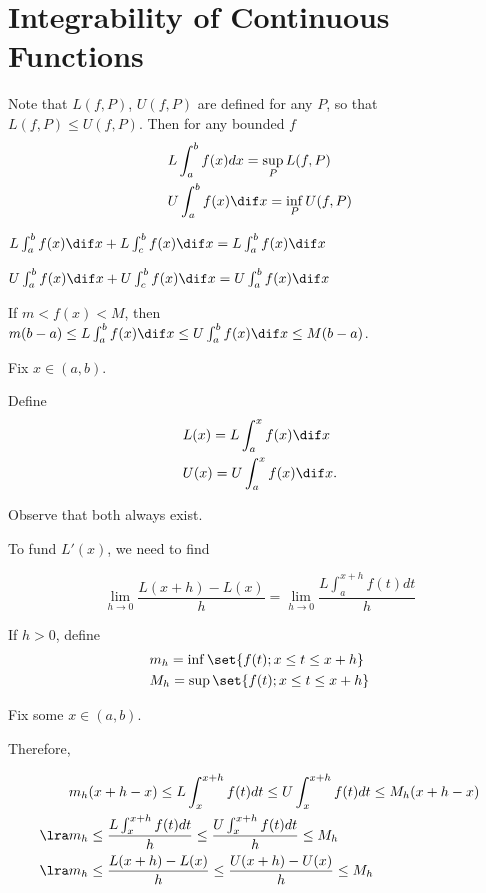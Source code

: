\documentclass[11pt]{scrartcl}
\begin{document}
\section{Integrability of Continuous Functions}

\begin{definition}
  Note that $L(f, P)$, $U(f, P)$ are defined for any $P$, so that
  $L(f, P) \leq U(f, P)$. Then for any bounded $f$
  \begin{align*}
    &L\int_a^bf(x)dx = \sup_PL(f, P)\\
    &U\int_a^bf(x)\dif x = \inf_PU(f, P)
  \end{align*}
\end{definition}

\begin{lemma}
  $L\int_a^bf(x)\dif x + L\int_c^bf(x)\dif x = L\int_a^bf(x)\dif x$
\end{lemma}
\begin{lemma}
  $U\int_a^bf(x)\dif x + U\int_c^bf(x)\dif x = U\int_a^bf(x)\dif x$
\end{lemma}

If $m< f(x) < M$, then
$m(b-a)\leq L\int_a^bf(x)\dif x \leq U\int_a^bf(x)\dif x \leq M(b-a)$.

Fix $x\in(a,b)$.

Define
\begin{align*}
 & L(x) = L\int_a^xf(x)\dif x\\
 & U(x) = U\int_a^xf(x)\dif x.
\end{align*}

Observe that both always exist.

To fund $L'(x)$, we need to find


\begin{equation*}
  \lim_{h\to 0 }\frac{L(x+h) - L(x)}{h} = \lim_{h\to 0 } \frac{L\int_a^{x+h}f(t)dt}{h}
\end{equation*}

If $h>0$, define
\begin{align}
  &m_{h} = \inf\set{f(t); x\leq t \leq x+h}\\
  &M_{h} = \sup\set{f(t); x\leq t \leq x+h}
\end{align}

Fix some $x\in (a, b)$.

Therefore,

\begin{align}
  & m_h(x+h - x) \leq L\int_x^{x+h}f(t)dt \leq U\int_x^{x+h}f(t)dt \leq M_h(x+h-x)\\
  \lra   & m_h \leq \frac{L\int_x^{x+h}f(t)dt }{h}\leq \frac{U\int_x^{x+h}f(t)dt }{h}\leq M_h\\
  \lra & m_h \leq \frac{L(x+h) - L(x)}{h}\leq \frac{U(x+h) - U(x) }{h}\leq M_h
\end{align}
\end{document}
